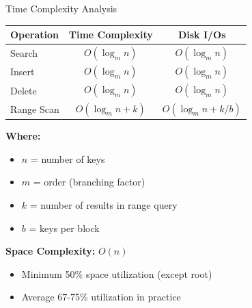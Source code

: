 \documentclass[aspectratio=169]{beamer}
\begin{document}
\begin{frame}{Time Complexity Analysis}
  \begin{center}
  \begin{tabular}{|l|c|c|}
    \hline
    \textbf{Operation} & \textbf{Time Complexity} & \textbf{Disk I/Os} \\
    \hline
    Search & $O(\log_m n)$ & $O(\log_m n)$ \\
    \hline
    Insert & $O(\log_m n)$ & $O(\log_m n)$ \\
    \hline
    Delete & $O(\log_m n)$ & $O(\log_m n)$ \\
    \hline
    Range Scan & $O(\log_m n + k)$ & $O(\log_m n + k/b)$ \\
    \hline
  \end{tabular}
  \end{center}

  \vspace{0.3cm}
  \textbf{Where:}
  \begin{itemize}
    \item $n$ = number of keys
    \item $m$ = order (branching factor)
    \item $k$ = number of results in range query
    \item $b$ = keys per block
  \end{itemize}

  \vspace{0.3cm}
  \textbf{Space Complexity:} $O(n)$
  \begin{itemize}
    \item Minimum 50\% space utilization (except root)
    \item Average 67-75\% utilization in practice
  \end{itemize}
\end{frame}
\end{document}
